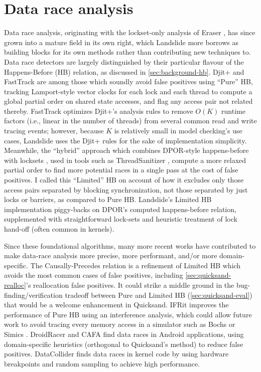 \section{Data race analysis}
\label{sec:related-data-race}

Data race analysis, originating with the lockset-only analysis of Eraser \cite{eraser},
has since grown into a mature field in its own right,
which Landslide more borrows as building blocks for its own methods rather than contributing new techniques to.
Data race detectors are largely distinguished by their particular flavour of the Happens-Before (HB) relation,
as discussed in \cref{sec:background-hb}.
Djit+ \cite{djit} and FastTrack \cite{fasttrack} are among those
which soundly avoid false positives using ``Pure'' HB,
tracking Lamport-style vector clocks \cite{lamport-clocks}
for each lock and each thread to compute a global partial order on shared state accesses,
and flag any access pair not related thereby.
FastTrack optimizes Djit+'s analysis rules to remove $O(K)$ runtime factors (i.e., linear in the number of threads)
from several common read and write tracing events;
however, because $K$ is relatively small in model checking's use cases,
Landslide uses the Djit+ rules for the sake of implementation simplicity.
Meanwhile, the ``hybrid'' approach which combines DPOR-style happens-before with locksets \cite{hybriddatarace},
used in tools such as ThreadSanitizer \cite{tsan},
compute a more relaxed partial order to find more potential races in a single pass at the cost of false positives.
I called this ``Limited'' HB on account of how it excludes only those access pairs separated by blocking synchronization,
not those separated by just locks or barriers,
as compared to Pure HB.
Landslide's Limited HB implementation piggy-backs on DPOR's computed happens-before relation,
supplemented with straightforward lock-sets and heuristic treatment of lock hand-off
(often common in kernels).

Since these foundational algorithms,
many more recent works have contributed to make data-race analysis more precise, more performant,
and/or more domain-specific.
The Causally-Precedes relation \cite{predictive-dr} is a refinement of Limited HB which avoids the most common cases of false positives,
including \cref{sec:quicksand-realloc}'s reallocation false positives.
It could strike a middle ground in the bug-finding/verification tradeoff
between Pure and Limited HB (\cref{sec:quicksand-eval})
that would be a welcome enhancement in Quicksand.
IFRit \cite{ifrit}
improves the performance of Pure HB using an interference analysis,
which could allow future work to avoid tracing every memory access in a simulator such as Bochs \cite{bochs} or Simics \cite{simics}.
%
DroidRacer \cite{droidracer} and CAFA \cite{cafa} find data races in Android applications,
using domain-specific heuristics (orthogonal to Quicksand's method) to reduce false positives.
DataCollider \cite{datacollider} finds data races in kernel code
by using hardware breakpoints and random sampling to achieve high performance.

